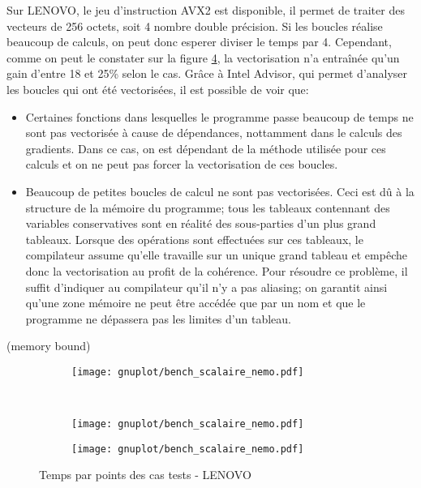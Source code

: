 Sur LENOVO, le jeu d'instruction AVX2 est disponible, il permet de traiter des vecteurs de 256 octets, soit 4 nombre double précision. Si les boucles réalise beaucoup de calculs, on peut donc esperer diviser le temps par 4. Cependant, comme on peut le constater sur la figure \ref{fig:bench_scal_nemo}, la vectorisation n'a entraînée qu'un gain d'entre 18 et 25\% selon le cas. Grâce à Intel Advisor, qui permet d'analyser les boucles qui ont été vectorisées, il est possible de voir que:
\begin{itemize}
\item Certaines fonctions dans lesquelles le programme passe beaucoup de temps ne sont pas vectorisée à cause de dépendances, nottamment dans le calculs des gradients. Dans ce cas, on est dépendant de la méthode utilisée pour ces calculs et on ne peut pas forcer la vectorisation de ces boucles.
\item Beaucoup de petites boucles de calcul ne sont pas vectorisées. Ceci est dû à la structure de la mémoire du programme; tous les tableaux contennant des variables conservatives sont en réalité des sous-parties d'un plus grand tableaux. Lorsque des opérations sont effectuées sur ces tableaux, le compilateur assume qu'elle travaille sur un unique grand tableau et empêche donc la vectorisation au profit de la cohérence. Pour résoudre ce problème, il suffit d'indiquer au compilateur qu'il n'y a pas aliasing; on garantit ainsi qu'une zone mémoire ne peut être accédée que par un nom et que le programme ne dépassera pas les limites d'un tableau.
\end{itemize}



(memory bound)



\begin{figure}[h!]
  \centering
  \begin{subfigure}[b]{0.5\textwidth}
    \centering
    \texttt{[image: gnuplot/bench\_scalaire\_nemo.pdf]}
  \caption{\label{fig:bench_scal_nemo_nonper}}
  \end{subfigure}%
  ~
  \begin{subfigure}[b]{0.5\textwidth}
    \centering
    \texttt{[image: gnuplot/bench\_scalaire\_nemo.pdf]}
  \caption{\label{fig:bench_scal_nemo_sym}}
  \end{subfigure}
  \begin{subfigure}[b]{0.5\textwidth}
    \centering
    \texttt{[image: gnuplot/bench\_scalaire\_nemo.pdf]}
  \caption{\label{fig:bench_scal_nemo_per}}
  \end{subfigure}
  \caption{\label{fig:bench_scal_nemo}Temps par points des cas tests - LENOVO}
\end{figure}



